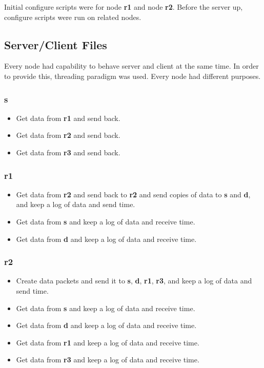 \documentclass[conference]{IEEEtran}
\begin{document}
Initial configure scripts were for node \textbf{r1} and node \textbf{r2}. Before the server up, configure scripts were run on related nodes.

\subsection{Server/Client Files}

Every node had capability to behave server and client at the same time. In order to provide this, threading paradigm was used. Every node had different purposes.
\subsubsection{\textbf{s}}
\begin{itemize}
    \item Get data from \textbf{r1} and send back.
    \item Get data from \textbf{r2} and send back.
    \item Get data from \textbf{r3} and send back.
\end{itemize}
\subsubsection{\textbf{r1}}
\begin{itemize}
    \item Get data from \textbf{r2} and send back to \textbf{r2} and send copies of data to \textbf{s} and \textbf{d}, and keep a log of data and send time.
    \item Get data from \textbf{s} and keep a log of data and receive time.
    \item Get data from \textbf{d} and keep a log of data and receive time.
\end{itemize}
\subsubsection{\textbf{r2}}
\begin{itemize}
    \item Create data packets and send it to \textbf{s}, \textbf{d}, \textbf{r1}, \textbf{r3}, and keep a log of data and send time. 
    \item Get data from \textbf{s} and keep a log of data and receive time.
    \item Get data from \textbf{d} and keep a log of data and receive time.
    \item Get data from \textbf{r1} and keep a log of data and receive time.
    \item Get data from \textbf{r3} and keep a log of data and receive time.
\end{itemize}
\end{document}
